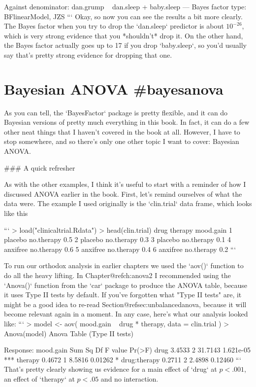 Against denominator:
  dan.grump ~ dan.sleep + baby.sleep 
---
Bayes factor type: BFlinearModel, JZS
```
Okay, so now you can see the results a bit more clearly. The Bayes factor when you try to drop the `dan.sleep` predictor is about $10^{-26}$, which is very strong evidence that you *shouldn't* drop it. On the other hand, the Bayes factor actually goes up to 17 if you drop `baby.sleep`, so you'd usually say that's pretty strong evidence for dropping that one.

\section{Bayesian ANOVA {#bayesanova}}

As you can tell, the `BayesFactor` package is pretty flexible, and it can do Bayesian versions of pretty much everything in this book. In fact, it can do a few other neat things that I haven't covered in the book at all. However, I have to stop somewhere, and so there's only one other topic I want to cover: Bayesian ANOVA. 

### A quick refresher

As with the other examples, I think it's useful to start with a reminder of how I discussed ANOVA earlier in the book. First, let's remind ourselves of what the data were. The example I used originally is the `clin.trial` data frame, which looks like this

```
> load("clinicaltrial.Rdata")
> head(clin.trial)
      drug    therapy mood.gain
1  placebo no.therapy       0.5
2  placebo no.therapy       0.3
3  placebo no.therapy       0.1
4 anxifree no.therapy       0.6
5 anxifree no.therapy       0.4
6 anxifree no.therapy       0.2
```


To run our orthodox analysis in earlier chapters we used the `aov()` function to do all the heavy lifting. In Chapter@refch:anova2 I recommended using the `Anova()` function from the `car` package to produce the ANOVA table, because it uses Type II tests by default. If you've forgotten what "Type II tests" are, it might be a good idea to re-read Section@refsec:unbalancedanova, because it will become relevant again in a moment. In any case, here's what our analysis looked like:
```
> model <- aov( mood.gain ~ drug * therapy, data = clin.trial )
> Anova(model)
Anova Table (Type II tests)

Response: mood.gain
             Sum Sq Df F value    Pr(>F)    
drug         3.4533  2 31.7143 1.621e-05 ***
therapy      0.4672  1  8.5816   0.01262 *  
drug:therapy 0.2711  2  2.4898   0.12460             
```
That's pretty clearly showing us evidence for a main effect of `drug` at $p<.001$, an effect of `therapy` at $p<.05$ and no interaction. 

